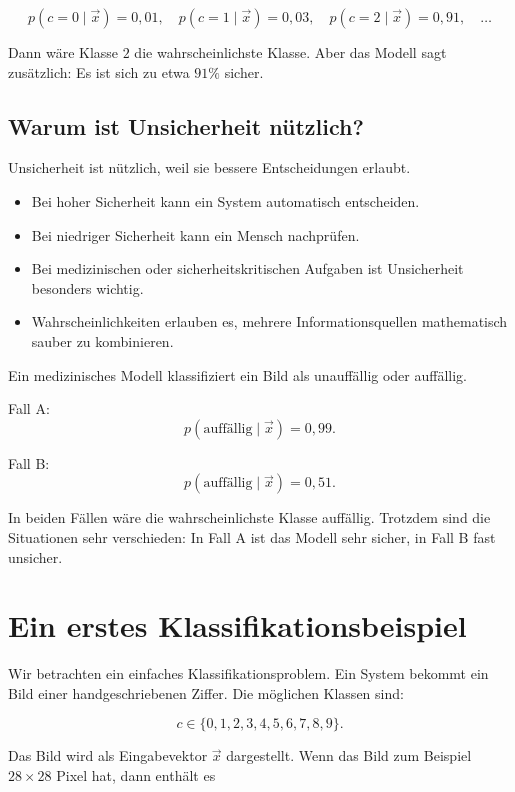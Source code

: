 \[
    p(c=0 \mid \vec{x}) = 0{,}01,
    \quad
    p(c=1 \mid \vec{x}) = 0{,}03,
    \quad
    p(c=2 \mid \vec{x}) = 0{,}91,
    \quad
    \dots
\]

Dann wäre Klasse \(2\) die wahrscheinlichste Klasse.
Aber das Modell sagt zusätzlich:
Es ist sich zu etwa \(91\%\) sicher.

\subsection{Warum ist Unsicherheit nützlich?}

Unsicherheit ist nützlich, weil sie bessere Entscheidungen erlaubt.

\begin{itemize}
    \item Bei hoher Sicherheit kann ein System automatisch entscheiden.
    \item Bei niedriger Sicherheit kann ein Mensch nachprüfen.
    \item Bei medizinischen oder sicherheitskritischen Aufgaben ist Unsicherheit besonders wichtig.
    \item Wahrscheinlichkeiten erlauben es, mehrere Informationsquellen mathematisch sauber zu kombinieren.
\end{itemize}

\begin{examplebox}
Ein medizinisches Modell klassifiziert ein Bild als unauffällig oder auffällig.

Fall A:
\[
    p(\text{auffällig} \mid \vec{x}) = 0{,}99.
\]

Fall B:
\[
    p(\text{auffällig} \mid \vec{x}) = 0{,}51.
\]

In beiden Fällen wäre die wahrscheinlichste Klasse auffällig.
Trotzdem sind die Situationen sehr verschieden:
In Fall A ist das Modell sehr sicher, in Fall B fast unsicher.
\end{examplebox}

\section{Ein erstes Klassifikationsbeispiel}

Wir betrachten ein einfaches Klassifikationsproblem.
Ein System bekommt ein Bild einer handgeschriebenen Ziffer.
Die möglichen Klassen sind:

\[
    c \in \{0,1,2,3,4,5,6,7,8,9\}.
\]

Das Bild wird als Eingabevektor \(\vec{x}\) dargestellt.
Wenn das Bild zum Beispiel \(28 \times 28\) Pixel hat, dann enthält es

